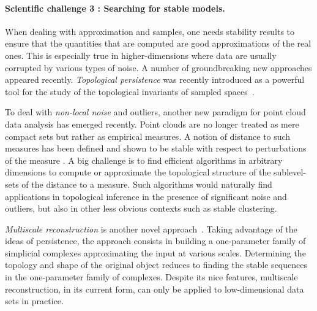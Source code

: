 
\paragraph{Scientific challenge 3 : Searching for stable models.} 
When dealing with approximation and samples, one needs stability results to ensure that the quantities that are computed are good approximations of the real ones. This is especially true in higher-dimensions where data are usually corrupted by various types of noise. A number of groundbreaking new approaches appeared recently.  {\em Topological persistence} was recently introduced as a powerful tool for the study of the topological invariants of sampled spaces~\cite{eh-ph-2008}. %

To deal with {\em non-local noise} and outliers, another  new paradigm for point cloud data analysis has emerged recently.  Point clouds are no longer treated as mere compact sets but rather as empirical measures. A notion of distance to such measures has been defined and shown to be stable with respect to perturbations of the measure \cite{ccsm-gipm-2011}. A big challenge is to find efficient algorithms in arbitrary dimensions to compute or approximate the topological structure of the sublevel-sets of the distance to a measure. Such algorithms would naturally find applications in topological inference in the presence of significant noise and outliers, but also in other less obvious contexts such as stable clustering. 

{\em Multiscale reconstruction} is another novel approach~\cite{geometrica-bgo-09}. Taking advantage of the ideas of persistence, the approach consists in building a one-parameter family of simplicial complexes approximating the input at various scales. %
 Determining the topology and shape of the original object reduces to finding the stable sequences in the one-parameter family of complexes. Despite its nice features, multiscale reconstruction, in its current form, can only be applied to low-dimensional data sets in practice. 



